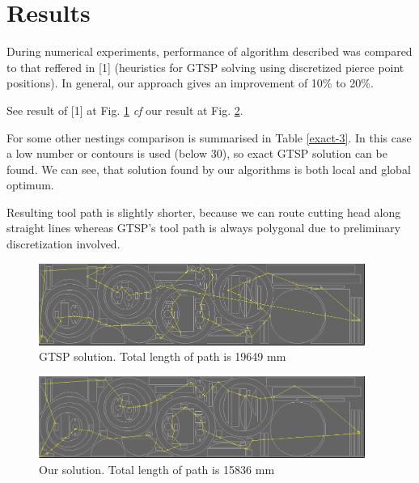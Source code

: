 \documentclass{../download/tPRS2e}
\begin{document}
\section{Results}

During numerical experiments,
performance of algorithm described
was compared to that reffered in [1]
(heuristics for GTSP solving
using discretized pierce point positions).
In general, our approach gives an improvement of 10\% to 20\%.

See result of [1] at Fig. \ref{dynprog}
\textit{cf} our result at Fig. \ref{heuristics}.

For some other nestings comparison is summarised in Table \ref{exact-3}.
In this case a low number or contours is used
(below 30),
so exact GTSP solution can be found.
We can see,
that solution found by our algorithms
is both local and global optimum.

Resulting tool path is slightly shorter,
because we can route cutting head along straight lines
whereas GTSP's tool path is always polygonal
due to preliminary discretization involved.

\begin{figure}[]
    \includegraphics[width=0.95\textwidth]{mini-bad.png}
    \caption{GTSP solution. Total length of path is 19649 mm}
    \label{dynprog}
\end{figure}

\begin{figure}[]
    \includegraphics[width=0.95\textwidth]{mini-good.png}
    \caption{Our solution. Total length of path is 15836 mm}
    \label{heuristics}
\end{figure}
\end{document}
